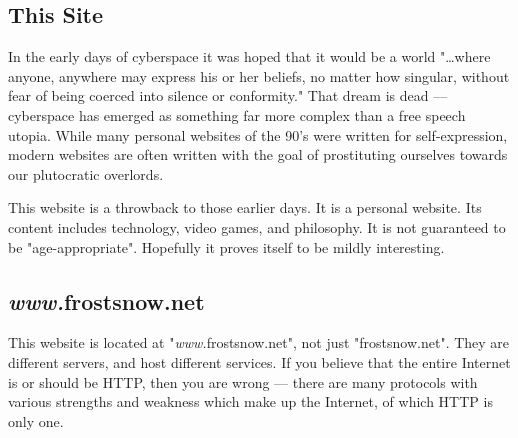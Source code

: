 \documentclass{article}
\begin{document}
\subsection{This Site}
In the early days of cyberspace it was hoped that it would be a world "\ldots where anyone, anywhere may express his or her beliefs, no matter how singular, without fear of being coerced into silence or conformity."  That dream is dead --- cyberspace has emerged as something far more complex than a free speech utopia.  While many personal websites of the 90's were written for self-expression, modern websites are often written with the goal of prostituting ourselves towards our plutocratic overlords.

This website is a throwback to those earlier days.  It is a personal website.  Its content includes technology, video games, and philosophy.  It is not guaranteed to be "age-appropriate".  Hopefully it proves itself to be mildly interesting.

\subsection{\emph{www.}frostsnow.net}
This website is located at "\emph{www.}frostsnow.net", not just "frostsnow.net".  They are different servers, and host different services.  If you believe that the entire Internet is or should be HTTP, then you are wrong --- there are many protocols with various strengths and weakness which make up the Internet, of which HTTP is only one.
\end{document}
